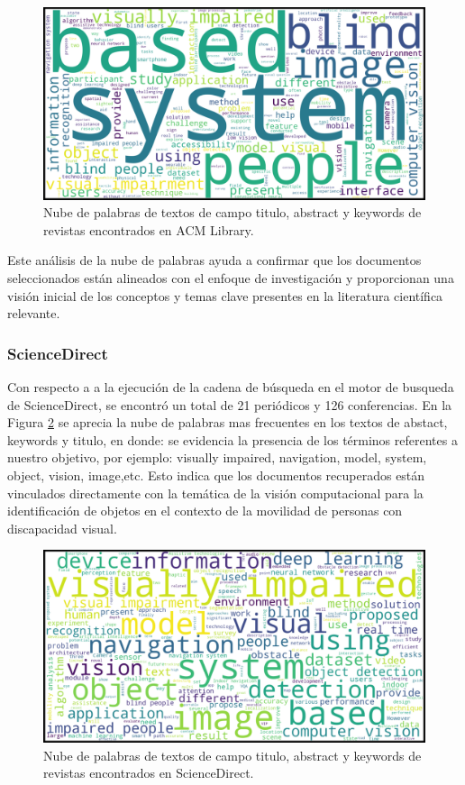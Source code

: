 \documentclass[letterpaper]{article}
\begin{document}
    	\begin{figure}[H]
    		\centering
    		\includegraphics[width=1\columnwidth]{graficos/ACM-nube.png}
    		\caption{Nube de palabras de textos de campo titulo, abstract y keywords de revistas encontrados en ACM Library.}
    		\label{cloud_w4}
    	\end{figure}

Este análisis de la nube de palabras ayuda a confirmar que los documentos seleccionados están alineados con el enfoque de investigación y proporcionan una visión inicial de los conceptos y temas clave presentes en la literatura científica relevante.

 \subsubsection{ScienceDirect}
    Con respecto a a la ejecución de la cadena de búsqueda en el motor de busqueda de ScienceDirect, se encontró un total de 21 periódicos y 126 conferencias.
En la Figura \ref{cloud_w5} se aprecia la nube de palabras mas frecuentes en los textos de abstact, keywords y titulo, en donde: se evidencia la presencia de los términos referentes a nuestro objetivo, por ejemplo: visually impaired, navigation, model, system, object, vision, image,etc. 
Esto indica que los documentos recuperados están vinculados directamente con la temática de la visión computacional para la identificación de objetos en el contexto de la movilidad de personas con discapacidad visual.

    	\begin{figure}[H]
    		\centering
    		\includegraphics[width=1\columnwidth]{graficos/ScienceDirect-nube.png}
    		\caption{Nube de palabras de textos de campo titulo, abstract y keywords de revistas encontrados en ScienceDirect.}
    		\label{cloud_w5}
    	\end{figure}
\end{document}
